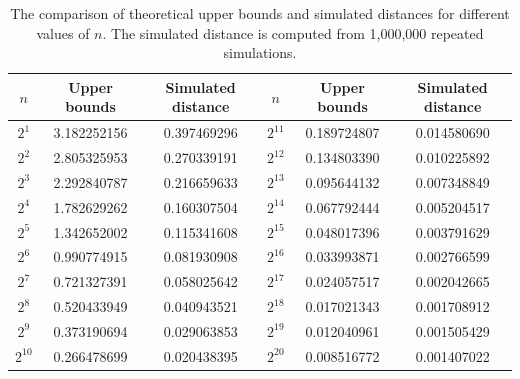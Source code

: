 \documentclass[pdflatex,sn-mathphys-ay]{sn-jnl}
\newcommand{\todoA}[1]{\todo[color=yellow!50]{#1}}
\newcommand{\E}{\mathbb{E}}
\theoremstyle{thmstyleone}%
\theoremstyle{thmstyletwo}%
\theoremstyle{thmstylethree}%
\begin{document}

\newpage
\begin{table}[htbp]
			\centering
			\begin{tabular}{|c|c|c|c|c|c|}
				\hline
				$n$ &  Upper bounds & Simulated distance & $n$ &  Upper bounds & Simulated distance\\
				\hline
				$2^{1}$  & 3.182252156 & 0.397469296  & $2^{11}$ & 0.189724807 &  0.014580690\\
				$2^{2}$  & 2.805325953 & 0.270339191  & $2^{12}$ & 0.134803390 & 0.010225892\\
				$2^{3}$  & 2.292840787 & 0.216659633 & $2^{13}$ & 0.095644132 & 0.007348849 \\
				$2^{4}$  & 1.782629262 & 0.160307504 & $2^{14}$ & 0.067792444 & 0.005204517 \\
				$2^{5}$  & 1.342652002 & 0.115341608 & $2^{15}$ & 0.048017396 & 0.003791629 \\
				$2^{6}$  & 0.990774915 & 0.081930908 & $2^{16}$ & 0.033993871 & 0.002766599 \\
				$2^{7}$  & 0.721327391 & 0.058025642 & $2^{17}$ & 0.024057517 & 0.002042665  \\
				$2^{8}$  & 0.520433949 & 0.040943521 & $2^{18}$ & 0.017021343 & 0.001708912 \\
				$2^{9}$  & 0.373190694 & 0.029063853 & $2^{19}$ & 0.012040961 & 0.001505429 \\
				$2^{10}$ & 0.266478699 & 0.020438395 & $2^{20}$ & 0.008516772 & 0.001407022 \\
				\hline
			\end{tabular}
            
			\caption{The comparison of theoretical upper bounds and simulated distances for different values of $n$. The simulated distance is computed from 1,000,000 repeated simulations.}
        \label{tab:insure}
		\end{table}
\end{document}
